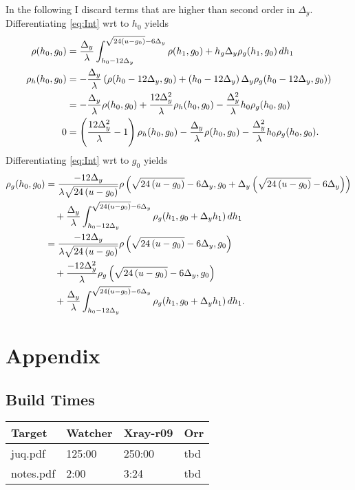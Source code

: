 \documentclass[]{article}
\begin{document}
In the following I discard terms that are higher than second order in
$\Delta_y$.  Differentiating \eqref{eq:Int}  wrt to $h_0$ yields 
\begin{align*}
  \rho(h_0,g_0) &= \frac{\Delta_y}{\lambda} \int_{h_0 - 12 \Delta_y}^{\sqrt{24(u-g_0)} - 6 \Delta_y}
  \rho(h_1, g_0)  + h_g \Delta_y \rho_g(h_1, g_0) \, dh_1 \\
  \rho_h(h_0, g_0) &= - \frac{\Delta_y}{\lambda} \left( \rho(h_0
    -12\Delta_y, g_0) + \left(h_0 - 12\Delta_y \right) \Delta_y \rho_g
    ( h_0 - 12\Delta_y, g_0) \right) \\
  &= - \frac{\Delta_y}{\lambda} \rho( h_0, g_0) + \frac{12
    \Delta^2_y}{\lambda} \rho_h( h_0, g_0) -
  \frac{\Delta^2_y}{\lambda} h_0 \rho_g(h_0, g_0) \\
  0 &= \left( \frac{12 \Delta^2_y}{\lambda} - 1 \right) \rho_h( h_0, g_0)
  - \frac{\Delta_y}{\lambda} \rho( h_0, g_0) -
  \frac{\Delta^2_y}{\lambda} h_0 \rho_g(h_0, g_0).
\end{align*}
Differentiating \eqref{eq:Int}  wrt to $g_0$ yields 
\begin{align*}
  \rho_g(h_0, g_0) %
  &= \frac{-12 \Delta_y} {\lambda \Rad{-g_0}}
  \rho\left( \Rad{-g_0} - 6\Delta_y, g_0  +\Delta_y \left( \Rad{-g_0}
      - 6 \Delta_y \right) \right) \\
  & \quad + \frac{\Delta_y}{\lambda} \int\RANGE \rho_g(h_1, g_0 +
  \Delta_y h_1) \, dh_1 \\
  &= \frac{-12 \Delta_y} {\lambda \Rad{-g_0}}
  \rho\left( \Rad{-g_0} -6\Delta_y, g_0  \right) \\
  & \quad + \frac{-12 \Delta^2_y} {\lambda}
  \rho_g\left( \Rad{-g_0} -6\Delta_y, g_0  \right) \\
  & \quad + \frac{\Delta_y}{\lambda} \int\RANGE \rho_g(h_1, g_0 +
  \Delta_y h_1) \, dh_1.
\end{align*}

\section{Appendix}
\label{sec:appendix}

\subsection{Build Times}
\label{sec:build-times}
\begin{center}
  \begin{tabular}{|l|l|l|l|}
    \hline
    Target     & Watcher & Xray-r09 & Orr \\ \hline
    juq.pdf    & 125:00  & 250:00   & tbd \\
    notes.pdf  & 2:00    &   3:24   & tbd \\ \hline
  \end{tabular}
\end{center}
\end{document}
